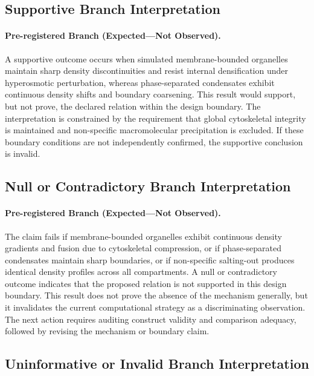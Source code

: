\documentclass[conference]{IEEEtran}
\begin{document}
\subsection{Supportive Branch Interpretation}
\paragraph{Pre-registered Branch (Expected---Not Observed).} A supportive outcome occurs when simulated membrane-bounded organelles maintain sharp density discontinuities and resist internal densification under hyperosmotic perturbation, whereas phase-separated condensates exhibit continuous density shifts and boundary coarsening. This result would support, but not prove, the declared relation within the design boundary. The interpretation is constrained by the requirement that global cytoskeletal integrity is maintained and non-specific macromolecular precipitation is excluded. If these boundary conditions are not independently confirmed, the supportive conclusion is invalid.~\cite{cite_42ed299a53990c06,cite_7161cfcb40366dd0}

\subsection{Null or Contradictory Branch Interpretation}
\paragraph{Pre-registered Branch (Expected---Not Observed).} The claim fails if membrane-bounded organelles exhibit continuous density gradients and fusion due to cytoskeletal compression, or if phase-separated condensates maintain sharp boundaries, or if non-specific salting-out produces identical density profiles across all compartments. A null or contradictory outcome indicates that the proposed relation is not supported in this design boundary. This result does not prove the absence of the mechanism generally, but it invalidates the current computational strategy as a discriminating observation. The next action requires auditing construct validity and comparison adequacy, followed by revising the mechanism or boundary claim.~\cite{cite_3222d2eeb7add195,cite_3480a6462f7a2d86}

\subsection{Uninformative or Invalid Branch Interpretation}
\end{document}
